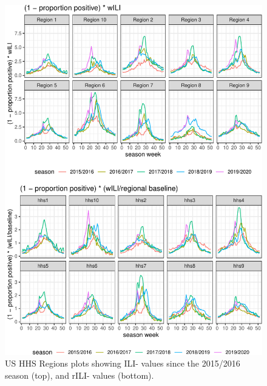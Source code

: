 \documentclass[]{article}
\begin{document}
\begin{figure}
\centering
\includegraphics{ili-labtest-report_files/figure-latex/all-region-plot-ILI--1.pdf}
\caption{\label{fig:region10-plot}US HHS Regions plots showing ILI-
values since the 2015/2016 season (top), and rILI- values (bottom).}
\end{figure}
\end{document}
